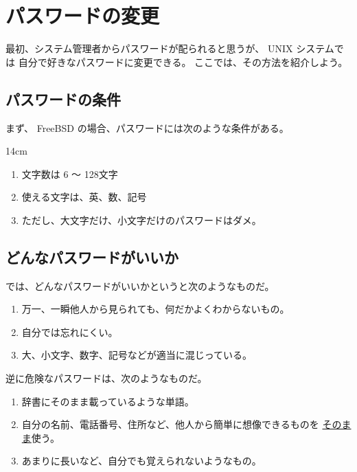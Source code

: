 \newpage

\section{パスワードの変更}

最初、システム管理者からパスワードが配られると思うが、 UNIX システムでは
自分で好きなパスワードに変更できる。
ここでは、その方法を紹介しよう。

\subsection{パスワードの条件}

まず、 FreeBSD の場合、パスワードには次のような条件がある。

\begin{coml}{14cm}
\begin{normalsize}
\begin{enumerate}
\item 文字数は 6 〜 128文字
\item 使える文字は、英、数、記号
\item ただし、大文字だけ、小文字だけのパスワードはダメ。
\end{enumerate}
\end{normalsize}
\end{coml}

\subsection{どんなパスワードがいいか}

では、どんなパスワードがいいかというと次のようなものだ。
\begin{enumerate}
\item 万一、一瞬他人から見られても、何だかよくわからないもの。
\item 自分では忘れにくい。
\item 大、小文字、数字、記号などが適当に混じっている。
\end{enumerate}

逆に危険なパスワードは、次のようなものだ。

\begin{enumerate}
\item 辞書にそのまま載っているような単語。
\item 自分の名前、電話番号、住所など、他人から簡単に想像できるものを
\underline{そのまま}使う。
\item あまりに長いなど、自分でも覚えられないようなもの。
\end{enumerate}

